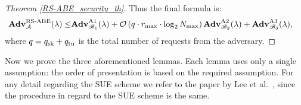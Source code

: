 \documentclass[a4paper,10pt]{article}
\newcommand{\bigO}[1]{\mathcal{O}\left( #1 \right)}
\newcommand{\adv}{\textbf{Adv}}
\begin{document}
\begin{proof}[Theorem \ref{RS-ABE_security_th}]
	Thus the final formula is:
	\begin{align*}
	\adv_{\mathcal{A}}^{\textnormal{RS-ABE}}(\lambda) \leq & \adv_{\mathscr{B}_1}^{\textnormal{A1}}(\lambda) + \bigO{q \cdot r_\textnormal{max} \cdot \log_2 N_\textnormal{max} }\adv_{\mathscr{B}_2}^{\textnormal{A2}}(\lambda) + \adv_{\mathscr{B}_3}^{\textnormal{A3}}(\lambda),
	\end{align*}
	where $q=q_{\textnormal{sk}}+q_{\textnormal{tu}}$ is the total number of requests from the adversary.
	\end{proof}
	Now we prove the three aforementioned lemmas.
	Each lemma uses only a single assumption: the order of presentation is based on the required assumption.
	For any detail regarding the SUE scheme we refer to the paper by Lee et al.~\cite{lee2013RSABE}, since the procedure in regard to the SUE scheme is the same.
\end{document}
